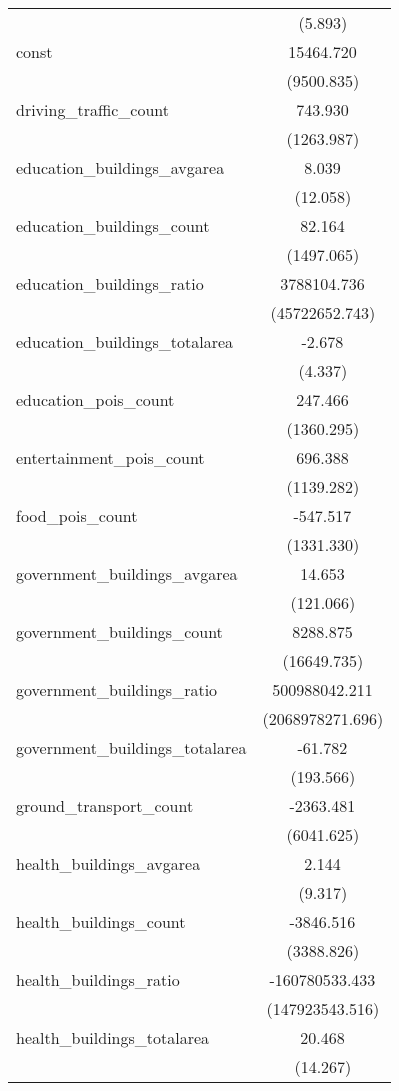 \begin{table}[!htbp]
\begin{tabular}{@{\extracolsep{5pt}}lc}
  & (5.893) \\
 const & 15464.720$^{}$ \\
  & (9500.835) \\
 driving_traffic_count & 743.930$^{}$ \\
  & (1263.987) \\
 education_buildings_avgarea & 8.039$^{}$ \\
  & (12.058) \\
 education_buildings_count & 82.164$^{}$ \\
  & (1497.065) \\
 education_buildings_ratio & 3788104.736$^{}$ \\
  & (45722652.743) \\
 education_buildings_totalarea & -2.678$^{}$ \\
  & (4.337) \\
 education_pois_count & 247.466$^{}$ \\
  & (1360.295) \\
 entertainment_pois_count & 696.388$^{}$ \\
  & (1139.282) \\
 food_pois_count & -547.517$^{}$ \\
  & (1331.330) \\
 government_buildings_avgarea & 14.653$^{}$ \\
  & (121.066) \\
 government_buildings_count & 8288.875$^{}$ \\
  & (16649.735) \\
 government_buildings_ratio & 500988042.211$^{}$ \\
  & (2068978271.696) \\
 government_buildings_totalarea & -61.782$^{}$ \\
  & (193.566) \\
 ground_transport_count & -2363.481$^{}$ \\
  & (6041.625) \\
 health_buildings_avgarea & 2.144$^{}$ \\
  & (9.317) \\
 health_buildings_count & -3846.516$^{}$ \\
  & (3388.826) \\
 health_buildings_ratio & -160780533.433$^{}$ \\
  & (147923543.516) \\
 health_buildings_totalarea & 20.468$^{}$ \\
  & (14.267) \\

\end{tabular}
\end{table}
